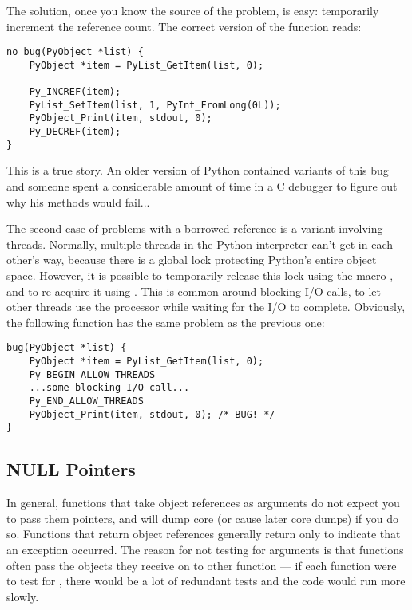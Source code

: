 The solution, once you know the source of the problem, is easy:
temporarily increment the reference count.  The correct version of the
function reads:

\begin{verbatim}
no_bug(PyObject *list) {
    PyObject *item = PyList_GetItem(list, 0);

    Py_INCREF(item);
    PyList_SetItem(list, 1, PyInt_FromLong(0L));
    PyObject_Print(item, stdout, 0);
    Py_DECREF(item);
}
\end{verbatim}

This is a true story.  An older version of Python contained variants
of this bug and someone spent a considerable amount of time in a C
debugger to figure out why his  methods would fail...

The second case of problems with a borrowed reference is a variant
involving threads.  Normally, multiple threads in the Python
interpreter can't get in each other's way, because there is a global
lock protecting Python's entire object space.  However, it is possible
to temporarily release this lock using the macro
, and to re-acquire it using
.  This is common around blocking
I/O calls, to let other threads use the processor while waiting for
the I/O to complete.  Obviously, the following function has the same
problem as the previous one:

\begin{verbatim}
bug(PyObject *list) {
    PyObject *item = PyList_GetItem(list, 0);
    Py_BEGIN_ALLOW_THREADS
    ...some blocking I/O call...
    Py_END_ALLOW_THREADS
    PyObject_Print(item, stdout, 0); /* BUG! */
}
\end{verbatim}


\subsection{NULL Pointers
            \label{nullPointers}}

In general, functions that take object references as arguments do not
expect you to pass them \NULL{} pointers, and will dump core (or
cause later core dumps) if you do so.  Functions that return object
references generally return \NULL{} only to indicate that an
exception occurred.  The reason for not testing for \NULL{}
arguments is that functions often pass the objects they receive on to
other function --- if each function were to test for \NULL,
there would be a lot of redundant tests and the code would run more
slowly.

